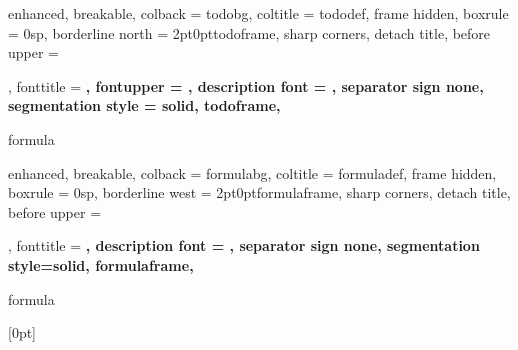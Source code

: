{%
  enhanced,
  breakable,
  colback = todobg,
  coltitle = tododef,
  frame hidden,
  boxrule = 0sp,
  borderline north = {2pt}{0pt}{todoframe},
  sharp corners,
  detach title,
  before upper = \tcbtitle\par\smallskip,
  fonttitle = \selectfont\bfseries,
  fontupper = \selectfont\bfseries,
  description font = \mdseries,
  separator sign none,
  segmentation style = {solid, todoframe},
}
{formula}

\newcommand{\doto}[1]
{%
  \begin{Todo*}{Do, Think, Remember}{}
    #1
  \end{Todo*}
}%




{%
  enhanced,
  breakable,
  colback = formulabg,
  coltitle = formuladef,
  frame hidden,
  boxrule = 0sp,
  borderline west = {2pt}{0pt}{formulaframe},
  sharp corners,
  detach title,
  before upper = \tcbtitle\par\smallskip,
  fonttitle = \bfseries\sffamily,
  description font = \mdseries,
  separator sign none,
  segmentation style={solid, formulaframe},
}
{formula}

\newcommand{\formula}[2]
{%
  \begin{Formula}{#1}{}
    #2
  \end{Formula}
}%

[0pt]{\normalsize\bfseries\protect\addvspace{15pt}}%
{}{\partname{} }%
{\enspace\titlerule\contentspage}%
